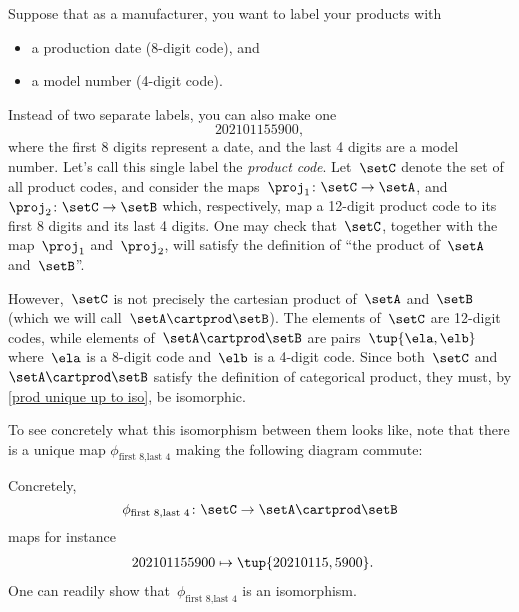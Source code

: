 
\begin{example}
	\label{ex:univ-prop-prod}
	Suppose that as a manufacturer, you want to label your products with
	\begin{itemize}
		\item a production date (8-digit code), and
		\item a model number (4-digit code).
	\end{itemize}
	Instead of two separate labels, you can also make one
	\begin{equation}
		\label{eq:exa-prod-univ-prop-code}
		202101155900,
	\end{equation}
	where the first 8 digits represent a date, and the last 4 digits are a model number.
	Let's call this single label the \emph{product code}.
	Let~$\setC$ denote the set of all product codes, and consider the maps~$\proj_1\colon \setC\to \setA$, and~$\proj_2\colon \setC\to \setB$ which, respectively, map a 12-digit product code to its first 8 digits and its last 4 digits.
	One may check that~$\setC$, together with the map~$\proj_1$ and~$\proj_2$, will satisfy the definition of ``the product of~$\setA$ and~$\setB$''.

	\begin{center}
	\end{center}

	However,~$\setC$ is not precisely the cartesian product of~$\setA$ and~$\setB$ (which we will call~$\setA\cartprod \setB$).
	The elements of~$\setC$ are 12-digit codes, while elements of~$\setA\cartprod \setB$ are pairs~$\tup{\ela,\elb}$ where~$\ela$ is a 8-digit code and~$\elb$ is a 4-digit code.
	Since both~$\setC$ and~$\setA\cartprod \setB$ satisfy the definition of categorical product, they must, by \cref{prod unique up to iso}, be isomorphic.

	\begin{center}
	\end{center}

	To see concretely what this isomorphism between them looks like, note that there is a unique map $\phi_{\text{first 8},\text{last 4}}$ making the following diagram commute:

	\begin{center}
	\end{center}

	Concretely,~
	\begin{equation}
		\label{eq:exa-univ-iso}
		\phi_{\text{first 8},\text{last 4}}\colon \setC \to \setA\cartprod \setB
	\end{equation}
	maps for instance
	\begin{equation}
		\label{eq:exa-univ-iso-concrete}
		\begin{aligned}
			202101155900 & \mapsto \tup{20210115,5900}.
		\end{aligned}
	\end{equation}
	One can readily show that~$\phi_{\text{first 8},\text{last 4}}$ is an isomorphism.
\end{example}

